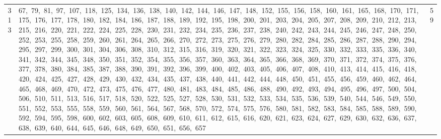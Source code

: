 \begin{longtable}{c|p{}|r}
313 & 67,\ 79,\ 81,\ 97,\ 107,\ 118,\ 125,\ 134,\ 136,\ 138,\ 140,\ 142,\ 144,\ 146,\ 147,\ 148,\ 152,\ 155,\ 156,\ 158,\ 160,\ 161,\ 165,\ 168,\ 170,\ 171,\ 175,\ 176,\ 177,\ 178,\ 180,\ 182,\ 184,\ 186,\ 187,\ 188,\ 189,\ 192,\ 195,\ 198,\ 200,\ 201,\ 203,\ 204,\ 205,\ 207,\ 208,\ 209,\ 210,\ 212,\ 213,\ 215,\ 216,\ 220,\ 221,\ 222,\ 224,\ 225,\ 228,\ 230,\ 231,\ 232,\ 234,\ 235,\ 236,\ 237,\ 238,\ 240,\ 242,\ 243,\ 244,\ 245,\ 246,\ 247,\ 248,\ 250,\ 252,\ 253,\ 255,\ 258,\ 259,\ 260,\ 261,\ 264,\ 265,\ 266,\ 270,\ 272,\ 273,\ 275,\ 276,\ 279,\ 280,\ 282,\ 284,\ 285,\ 286,\ 287,\ 288,\ 290,\ 294,\ 295,\ 297,\ 299,\ 300,\ 301,\ 304,\ 306,\ 308,\ 310,\ 312,\ 315,\ 316,\ 319,\ 320,\ 321,\ 322,\ 323,\ 324,\ 325,\ 330,\ 332,\ 333,\ 335,\ 336,\ 340,\ 341,\ 342,\ 344,\ 345,\ 348,\ 350,\ 351,\ 352,\ 354,\ 355,\ 356,\ 357,\ 360,\ 363,\ 364,\ 365,\ 366,\ 368,\ 369,\ 370,\ 371,\ 372,\ 374,\ 375,\ 376,\ 377,\ 378,\ 380,\ 384,\ 385,\ 387,\ 388,\ 390,\ 391,\ 392,\ 396,\ 399,\ 400,\ 402,\ 403,\ 405,\ 406,\ 407,\ 408,\ 410,\ 413,\ 414,\ 415,\ 416,\ 418,\ 420,\ 424,\ 425,\ 427,\ 428,\ 429,\ 430,\ 432,\ 434,\ 435,\ 437,\ 438,\ 440,\ 441,\ 442,\ 444,\ 448,\ 450,\ 451,\ 455,\ 456,\ 459,\ 460,\ 462,\ 464,\ 465,\ 468,\ 469,\ 470,\ 472,\ 473,\ 475,\ 476,\ 477,\ 480,\ 481,\ 483,\ 484,\ 485,\ 486,\ 488,\ 490,\ 492,\ 493,\ 494,\ 495,\ 496,\ 497,\ 500,\ 504,\ 506,\ 510,\ 511,\ 513,\ 516,\ 517,\ 518,\ 520,\ 522,\ 525,\ 527,\ 528,\ 530,\ 531,\ 532,\ 533,\ 534,\ 535,\ 536,\ 539,\ 540,\ 544,\ 546,\ 549,\ 550,\ 551,\ 552,\ 553,\ 555,\ 558,\ 559,\ 560,\ 561,\ 564,\ 567,\ 568,\ 570,\ 572,\ 574,\ 575,\ 576,\ 580,\ 581,\ 582,\ 583,\ 584,\ 585,\ 588,\ 589,\ 590,\ 592,\ 594,\ 595,\ 598,\ 600,\ 602,\ 603,\ 605,\ 608,\ 609,\ 610,\ 611,\ 612,\ 615,\ 616,\ 620,\ 621,\ 623,\ 624,\ 627,\ 629,\ 630,\ 632,\ 636,\ 637,\ 638,\ 639,\ 640,\ 644,\ 645,\ 646,\ 648,\ 649,\ 650,\ 651,\ 656,\ 657 & 59 \\

\end{longtable}
